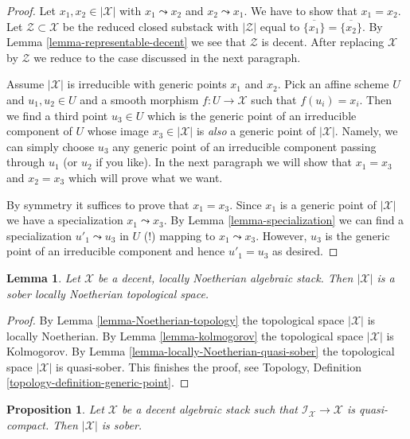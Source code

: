 \documentclass{stacks-project}
\theoremstyle{plain}
\newtheorem{proposition}[subsection]{Proposition}
\newtheorem{lemma}[subsection]{Lemma}
\theoremstyle{definition}
\theoremstyle{remark}
\numberwithin{equation}{subsection}
\begin{document}
\begin{proof}
Let $x_1, x_2 \in |\mathcal{X}|$ with $x_1 \leadsto x_2$ and
$x_2 \leadsto x_1$. We have to show that $x_1 = x_2$.
Let $\mathcal{Z} \subset \mathcal{X}$ be the reduced closed
substack with $|\mathcal{Z}|$ equal to
$\overline{\{x_1\}} = \overline{\{x_2\}}$.
By Lemma \ref{lemma-representable-decent}
we see that $\mathcal{Z}$ is decent.
After replacing $\mathcal{X}$ by $\mathcal{Z}$ we reduce to
the case discussed in the next paragraph.

\medskip\noindent
Assume $|\mathcal{X}|$ is irreducible with generic points
$x_1$ and $x_2$. Pick an affine scheme $U$ and $u_1, u_2 \in U$
and a smooth morphism $f : U \to \mathcal{X}$ such that
$f(u_i) = x_i$. Then we find a third point $u_3 \in U$
which is the generic point of an irreducible component of $U$
whose image $x_3 \in |\mathcal{X}|$ is {\it also} a
generic point of $|\mathcal{X}|$. Namely, we can simply
choose $u_3$ any generic point of an irreducible component
passing through $u_1$ (or $u_2$ if you like).
In the next paragraph we will show that $x_1 = x_3$ and $x_2 = x_3$
which will prove what we want.

\medskip\noindent
By symmetry it suffices to prove that $x_1 = x_3$. Since $x_1$
is a generic point of $|\mathcal{X}|$ we have a specialization
$x_1 \leadsto x_3$.
By Lemma \ref{lemma-specialization} we can find a specialization
$u'_1 \leadsto u_3$ in $U$ (!) mapping to $x_1 \leadsto x_3$.
However, $u_3$ is the generic point of an irreducible component
and hence $u'_1 = u_3$ as desired.
\end{proof}

\begin{lemma}
\label{lemma-decent-locally-noetherian-sober}
Let $\mathcal{X}$ be a decent, locally Noetherian algebraic stack.
Then $|\mathcal{X}|$ is a sober locally Noetherian topological space.
\end{lemma}

\begin{proof}
By Lemma \ref{lemma-Noetherian-topology} the topological space $|\mathcal{X}|$
is locally Noetherian. By Lemma \ref{lemma-kolmogorov} the topological space
$|\mathcal{X}|$ is Kolmogorov. By
Lemma \ref{lemma-locally-Noetherian-quasi-sober} the topological space
$|\mathcal{X}|$ is quasi-sober. This finishes the proof, see
Topology, Definition \ref{topology-definition-generic-point}.
\end{proof}

\begin{proposition}
\label{proposition-decent-sober}
Let $\mathcal{X}$ be a decent algebraic stack such that
$\mathcal{I}_\mathcal{X} \to \mathcal{X}$ is quasi-compact.
Then $|\mathcal{X}|$ is sober.
\end{proposition}
\end{document}
